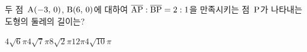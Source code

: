 두 점~$\mathrm{A}(-3,\,0)$, $\mathrm{B}(6,\,0)$에 대하여 $\overline{\mathrm{AP}}:\overline{\mathrm{BP}}=2:1$을 만족시키는 점~$\mathrm{P}$가 나타내는 도형의 둘레의 길이는?
\begin{choices32}{$4\sqrt{6}\pi$}{$4\sqrt{7}\pi$}{$8\sqrt{2}\pi$}{$12\pi$}{$4\sqrt{10}\pi$}\end{choices32}
